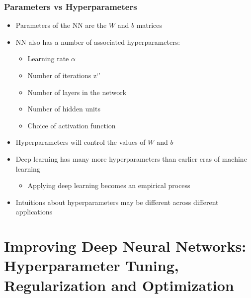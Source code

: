 \documentclass[12pt, letterpaper]{article}
\begin{document}
    \subsubsection{Parameters vs Hyperparameters}
    \begin{itemize}
        \item Parameters of the NN are the $W$ and $b$ matrices
        \item NN also has a number of associated hyperparameters:
        \begin{itemize}
            \item Learning rate $\alpha$
            \item Number of iterations z`'
            \item Number of layers in the network
            \item Number of hidden units
            \item Choice of activation function
        \end{itemize}
        \item Hyperparameters will control the values of $W$ and $b$
        \item Deep learning has many more hyperparameters than earlier eras of machine learning
        \begin{itemize}
            \item Applying deep learning becomes an empirical process
        \end{itemize}
        \item Intuitions about hyperparameters may be different across different applications
    \end{itemize}
    \pagebreak

    \section{Improving Deep Neural Networks: Hyperparameter Tuning, Regularization and Optimization}
\end{document}
